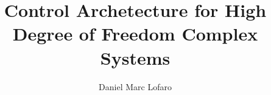 \documentclass[12pt, letterpaper]{drexelthesis}
\author{Daniel Marc Lofaro}
\title{Control Archetecture for High Degree of Freedom Complex Systems}
\begin{document}
 

	\doublespacing
	\maketitle 
\begin{preliminary}
	\sloppy
	\copyrightpage
	
	
	
	\mytableofcontents
	\mylistoftables
	\mylistoffigures
\end{preliminary}

\begin{thesis}
	\fussy
	
%	
	
	

	\singlespacing
%	
	
	
%	

	\appendix
\end{thesis}
\end{document}
